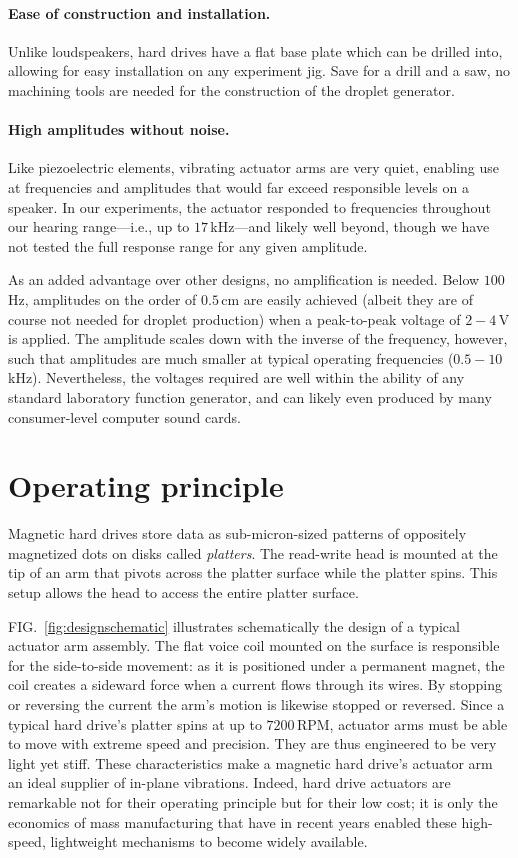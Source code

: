 \documentclass[aip,rsi,reprint,graphicx]{revtex4-1} %
\begin{document}
\paragraph*{Ease of construction and installation.} Unlike loudspeakers, hard
drives have a flat base plate which can be drilled into, allowing for easy
installation on any experiment jig. Save for a drill and a saw, no machining
tools are needed for the construction of the droplet generator.

\paragraph*{High amplitudes without noise.}
Like piezoelectric elements, vibrating actuator arms are very quiet, enabling
use at frequencies and amplitudes that would far exceed responsible levels on
a speaker.  In our experiments, the actuator responded to frequencies throughout
our hearing range---i.e., up to $17\,$kHz---and likely well beyond, though we
have not tested the full response range for any given amplitude.

As an added advantage over other designs, no amplification is needed. Below
$100\,$Hz, amplitudes on the order of $0.5\,$cm are easily achieved (albeit they
are of course not needed for droplet production) when a peak-to-peak voltage of
$2-4\,$V is applied. The amplitude scales down with the inverse of the frequency,
however, such that amplitudes are much smaller at typical operating frequencies
($0.5-10\,$kHz). Nevertheless, the voltages required are well within the ability
of any standard laboratory function generator, and can likely even produced by many
consumer-level computer sound cards.

\section{Operating principle}
Magnetic hard drives store data as sub-micron-sized patterns of 
oppositely magnetized dots on disks called \emph{platters}. The read-write head
is mounted at the tip of an arm that pivots across the platter surface while the
platter spins. This setup allows the head to access the entire platter surface.

FIG.~\ref{fig:designschematic} illustrates schematically the design of a typical
actuator arm assembly. The flat voice coil mounted on the surface is responsible for
the side-to-side movement: as it is positioned under a permanent magnet, the
coil creates a sideward force when a current flows through its wires. By
stopping or reversing the current the arm's motion is likewise stopped or
reversed. Since a typical hard drive's platter spins at up to $7200\,$RPM,
actuator arms must be able to move with extreme speed and precision. They are
thus engineered to be very light yet stiff. These characteristics make a
magnetic hard drive's actuator arm an ideal supplier of in-plane vibrations.
Indeed, hard drive actuators are remarkable not for their operating principle
but for their low cost; it is only the economics of mass manufacturing that have in
recent years enabled these high-speed, lightweight mechanisms to become widely available.
\end{document}
